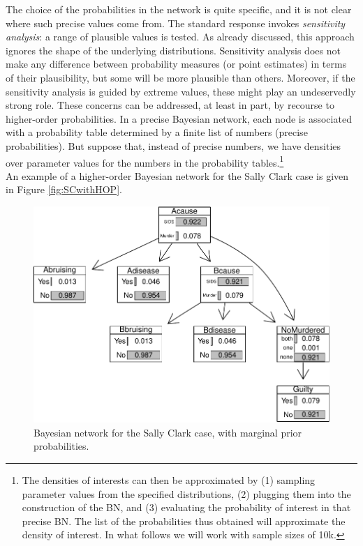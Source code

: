 \documentclass[
  10pt,
  dvipsnames,enabledeprecatedfontcommands]{scrartcl}
\begin{document}
The choice of the probabilities in the network is quite specific, and it
is not clear where such precise values come from. The standard response
invokes \emph{sensitivity analysis}: a range of plausible values is
tested. As already discussed, this approach ignores the shape of the
underlying distributions. Sensitivity analysis does not make any
difference between probability measures (or point estimates) in terms of
their plausibility, but some will be more plausible than others.
Moreover, if the sensitivity analysis is guided by extreme values, these
might play an undeservedly strong role. These concerns can be addressed,
at least in part, by recourse to higher-order probabilities. In a
precise Bayesian network, each node is associated with a probability
table determined by a finite list of numbers (precise probabilities).
But suppose that, instead of precise numbers, we have densities over
parameter values for the numbers in the probability tables.\footnote{The
  densities of interests can then be approximated by (1) sampling
  parameter values from the specified distributions, (2) plugging them
  into the construction of the BN, and (3) evaluating the probability of
  interest in that precise BN. The list of the probabilities thus
  obtained will approximate the density of interest. In what follows we
  will work with sample sizes of 10k.}\\
An example of a higher-order Bayesian network for the Sally Clark case
is given in Figure \ref{fig:SCwithHOP}.

\begin{figure}[H]

\begin{center}\includegraphics[width=0.5\linewidth]{imprecision_philosophical_paper2_files/figure-latex/scBNplot2-1} \end{center}
\caption{Bayesian network for the Sally Clark case, with marginal prior probabilities.}
\label{fig:scBNplot}
\end{figure}
\end{document}
